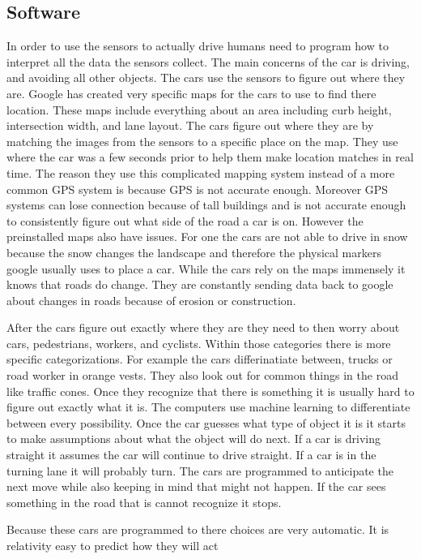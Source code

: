 \documentclass[11pt]{article}
\begin{document}
\subsection{Software}
\par
In order to use the sensors to actually drive humans need to program how to interpret all the data the sensors collect. The main concerns of the car is driving, and avoiding all other objects. 
The cars use the sensors to figure out where they are. Google has created very specific maps for the cars to use to find there location. These maps include everything about an area including curb height, intersection width, and lane layout. 
The cars figure out where they are by matching the images from the sensors to
a specific place on the map. They use where the car was a few seconds prior to help them make location matches in real
time. The reason they use this complicated mapping system instead of a more common GPS system is because GPS is not
accurate enough. Moreover GPS systems can lose connection because of tall buildings and is not accurate enough to
consistently figure out what side of the road a car is on. However the preinstalled maps also have issues. For one the
cars are not able to drive in snow because the snow changes the landscape and therefore the physical markers google
usually uses to place a car. While the cars rely on the maps immensely it knows that roads do change. They are
constantly sending data back to google about changes in roads because of erosion or construction. \par
After the cars figure out exactly where they are they need to then worry about cars, pedestrians, workers, and cyclists.
Within those categories there is more specific categorizations. For example the cars differinatiate between, trucks or
road worker in orange vests. They also look out for common things in the road like traffic cones. Once they recognize
that there is something it is usually hard to figure out exactly what it is. The computers use machine learning to
differentiate between every possibility. Once the car guesses what type of object it is it starts to make assumptions
about what the object will do next. If a car is driving straight it assumes the car will continue to drive straight. If
a car is in the turning lane it will probably turn. The cars are programmed to anticipate the next move while also
keeping in mind that might not happen. If the car sees something in the road that is cannot recognize it stops. 
\par
Because these cars are programmed to there choices are very automatic. It is relativity easy to predict how they will act
\end{document}
